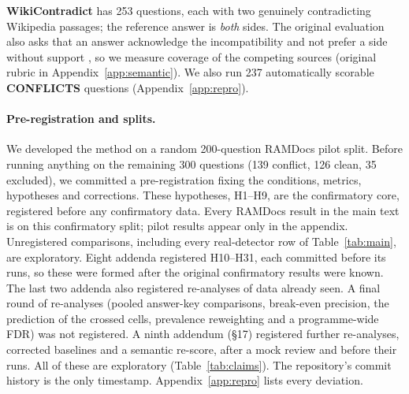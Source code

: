 \textbf{WikiContradict} \citep{hou2024wikicontradict} has 253 questions, each with two genuinely contradicting
Wikipedia passages; the reference answer is \emph{both} sides. The original evaluation also asks that an answer acknowledge the incompatibility and not prefer a side without support \citep[\S3.4]{hou2024wikicontradict}, so we measure coverage of the competing sources (original rubric in Appendix~\ref{app:semantic}). We also run 237 automatically scorable
\textbf{CONFLICTS} \citep{cattan2025conflicts} questions (Appendix~\ref{app:repro}).

\paragraph{Pre-registration and splits.}
We developed the method on a random 200-question RAMDocs pilot split. Before running anything on the remaining 300
questions (139 conflict, 126 clean, 35 excluded), we committed a pre-registration fixing the conditions, metrics,
hypotheses and corrections. These hypotheses, H1--H9, are the confirmatory core, registered before any confirmatory
data. Every RAMDocs result in the main text is on this confirmatory split; pilot results appear only in the appendix.
Unregistered comparisons, including every real-detector row of Table~\ref{tab:main}, are exploratory.
Eight addenda registered H10--H31, each committed before its runs, so these were formed after the
original confirmatory results were known. The last two addenda also registered re-analyses of data already
seen. A final round of re-analyses (pooled answer-key comparisons, break-even precision, the prediction of the crossed
cells, prevalence reweighting and a programme-wide FDR) was not registered. A ninth addendum (\S17) registered
further re-analyses, corrected baselines and a semantic re-score, after a mock review and before their runs. All of
these are exploratory (Table~\ref{tab:claims}). The repository's commit history is the only timestamp. Appendix~\ref{app:repro} lists every deviation.

